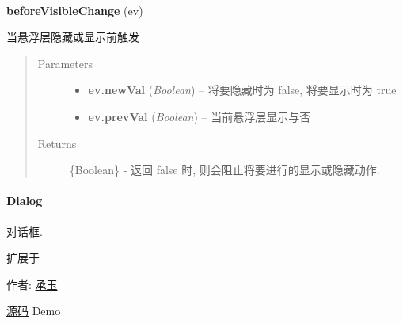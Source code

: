 \documentclass[letterpaper,10pt,english]{sphinxmanual}
\begin{document}

\begin{fulllineitems}
\label{api/component/overlay/overlay:Overlay.beforeVisibleChange}~
\begin{DUlineblock}{0em}
\item[] \textbf{beforeVisibleChange} (ev)
\item[] 当悬浮层隐藏或显示前触发
\end{DUlineblock}
\begin{quote}\begin{description}
\item[{Parameters}] \leavevmode\begin{itemize}
\item {}
\textbf{ev.newVal} (\emph{Boolean}) -- 将要隐藏时为 false, 将要显示时为 true

\item {}
\textbf{ev.prevVal} (\emph{Boolean}) -- 当前悬浮层显示与否

\end{itemize}

\item[{Returns}] \leavevmode
\{Boolean\} - 返回 false 时, 则会阻止将要进行的显示或隐藏动作.

\end{description}\end{quote}

\end{fulllineitems}

\label{api/component/overlay/dialog:module-Overlay}

\paragraph{Dialog}
\label{api/component/overlay/dialog::doc}\label{api/component/overlay/dialog:dialog}
\begin{DUlineblock}{0em}
\item[] 对话框.
\item[] 扩展于 {\hyperref[api/component/overlay/popup:module-Overlay]{}}
\item[] 作者: \href{mailto:yiminghe@gmail.com}{承玉}
\item[] \href{https://github.com/kissyteam/kissy/tree/master/src/overlay/}{源码}  \textbar{} Demo
\end{DUlineblock}
\end{document}
